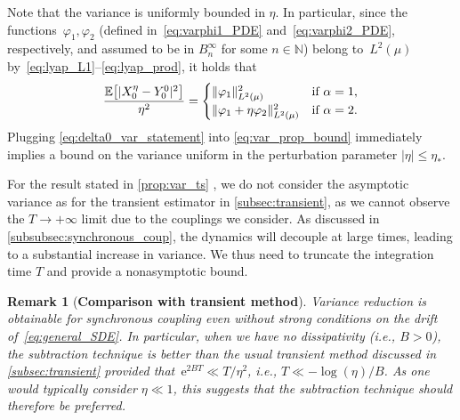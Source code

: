\documentclass[11pt]{article}
\newcommand{\E}{\mathbb{E}}
\newcommand{\N}{\mathbb{N}}
\newcommand{\e}{\mathrm{e}}
\renewcommand{\leq}{\leqslant}
\DeclarePairedDelimiter\abs{\lvert}{\rvert}
\DeclarePairedDelimiter\norm{\lVert}{\rVert}
\DeclarePairedDelimiter\bkt{\lbrack}{\rbrack}
\newtheorem{remark}{Remark}
\theoremstyle{definition}
\begin{document}
Note that the variance is uniformly bounded in $\eta$. In particular, since the functions~$\varphi_1,\varphi_2$ (defined in~\eqref{eq:varphi1_PDE} and~\eqref{eq:varphi2_PDE}, respectively, and assumed to be in $B^\infty_n$ for some $n\in\N$) belong to~$L^2(\mu)$ by~\eqref{eq:lyap_L1}--\eqref{eq:lyap_prod}, it holds that
\begin{equation}
	\frac{\E\bkt*{\abs{X_0^\eta - Y_0^0}^2}}{\eta^2} = 
	\begin{cases}
		\norm{\varphi_1}^2_{L^2(\mu)} &\text{if }\alpha = 1, \\
		\norm{\varphi_1 + \eta\varphi_2}^2_{L^2(\mu)} &\text{if }\alpha = 2.
	\end{cases}
\label{eq:delta0_var_statement}
\end{equation}
Plugging \eqref{eq:delta0_var_statement} into \eqref{eq:var_prop_bound} immediately implies a bound on the variance uniform in the perturbation parameter $|\eta| \leq \eta_*$.

For the result stated in \cref{prop:var_ts} , we do not consider the asymptotic variance as for the transient estimator in \cref{subsec:transient}, as we cannot observe the $T\to+\infty$ limit due to the couplings we consider. As discussed in \cref{subsubsec:synchronous_coup}, the dynamics will decouple at large times, leading to a substantial increase in variance. We thus need to truncate the integration time $T$ and provide a nonasymptotic bound.

\begin{remark}[{\bf Comparison with transient method}]
Variance reduction is obtainable for synchronous coupling even without strong conditions on the drift of~\eqref{eq:general_SDE}. In particular, when we have no dissipativity (i.e., $B>0$), the subtraction technique is better than the usual transient method discussed in \cref{subsec:transient} provided that~$\e^{2BT} \ll T/\eta^2$, i.e., $T\ll -\log(\eta)/B$. As one would typically consider $\eta\ll 1$, this suggests that the subtraction technique should therefore be preferred. 
\end{remark}
\end{document}
